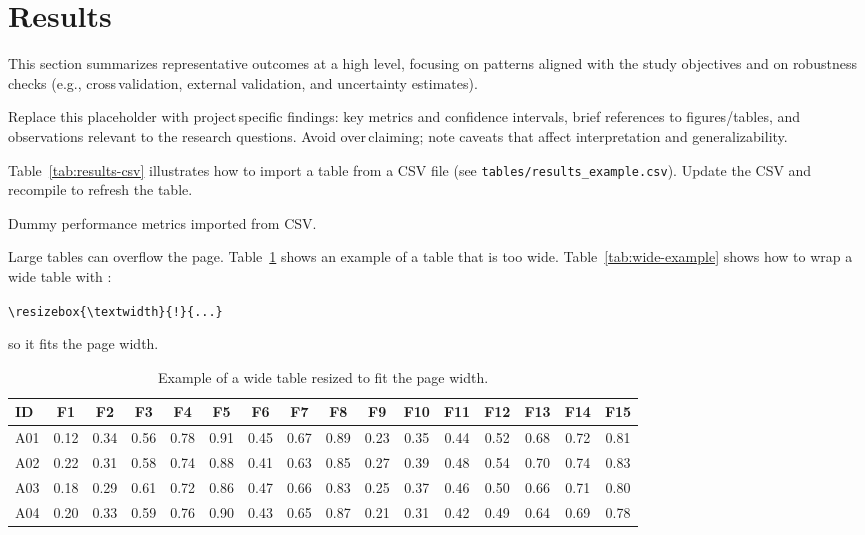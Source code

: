 \section{Results}

\noindent This section summarizes representative outcomes at a high level, focusing on patterns aligned with the study objectives and on robustness checks (e.g., cross\,validation, external validation, and uncertainty estimates).

\noindent Replace this placeholder with project\,specific findings: key metrics and confidence intervals, brief references to figures/tables, and observations relevant to the research questions. Avoid over\,claiming; note caveats that affect interpretation and generalizability.

\bigskip

\noindent Table~\ref{tab:results-csv} illustrates how to import a table from a CSV file (see \texttt{tables/results\_example.csv}). Update the CSV and recompile to refresh the table.

\begin{table}[h]
  \centering
  \caption{Dummy performance metrics imported from CSV.}
  \label{tab:results-csv}
\end{table}

\noindent Large tables can overflow the page. Table~\ref{tab:too-wide-example} shows an example of a table that is too wide. Table~\ref{tab:wide-example} shows how to wrap a wide table with :


\begin{center}
    \verb|\resizebox{\textwidth}{!}{...}| 
\end{center}

\noindent so it fits the page width.

\begin{table}[htbp]
    \centering
    \caption{Example of a wide table resized to fit the page width.}
    \label{tab:too-wide-example}
    \begin{tabular}{lccccccccccccccc}
        \toprule
        ID & F1 & F2 & F3 & F4 & F5 & F6 & F7 & F8 & F9 & F10 & F11 & F12 & F13 & F14 & F15 \\
        \midrule
        A01 & 0.12 & 0.34 & 0.56 & 0.78 & 0.91 & 0.45 & 0.67 & 0.89 & 0.23 & 0.35 & 0.44 & 0.52 & 0.68 & 0.72 & 0.81 \\
        A02 & 0.22 & 0.31 & 0.58 & 0.74 & 0.88 & 0.41 & 0.63 & 0.85 & 0.27 & 0.39 & 0.48 & 0.54 & 0.70 & 0.74 & 0.83 \\
        A03 & 0.18 & 0.29 & 0.61 & 0.72 & 0.86 & 0.47 & 0.66 & 0.83 & 0.25 & 0.37 & 0.46 & 0.50 & 0.66 & 0.71 & 0.80 \\
        A04 & 0.20 & 0.33 & 0.59 & 0.76 & 0.90 & 0.43 & 0.65 & 0.87 & 0.21 & 0.31 & 0.42 & 0.49 & 0.64 & 0.69 & 0.78 \\
        \bottomrule
    \end{tabular}
\end{table}


